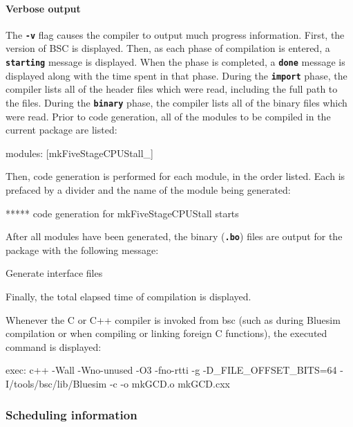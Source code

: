 \documentclass{article}
\newcommand{\te}[1]{\texttt{#1}}
\newenvironment{centerboxverbatim}
  {\center
   \boxedverbatim}
  {\endboxedverbatim
  {\endcenter }}
\begin{document}
\paragraph{Verbose output}
\index{-v@\te{-v} (compiler flag)}
The {\bf\tt -v} flag causes the compiler to output much progress
information.  First, the version of BSC is displayed.
Then, as each phase of compilation
is entered, a {\bf\tt starting} message is displayed.  When the phase
is completed, a {\bf\tt done} message is displayed along with the time
spent in that phase.  During the {\bf\tt import} phase, the compiler
lists all of the header files which were read, including the full path
to the files.  During the {\bf\tt binary} phase, the compiler lists all of
the binary files which were read.  Prior to code generation, all of the
modules to be compiled in the current package are listed:

\begin{centerboxverbatim}
modules: [mkFiveStageCPUStall_]
\end{centerboxverbatim}

Then, code generation is performed for each module, in the order listed.
Each is prefaced by a divider and the name of the module being generated:

\begin{centerboxverbatim}
*****
code generation for mkFiveStageCPUStall starts
\end{centerboxverbatim}

After all modules have been generated, the 
binary ({\bf\tt{}.bo}) files are output for the package with the
following message:

\begin{centerboxverbatim}
Generate interface files
\end{centerboxverbatim}

Finally, the total elapsed time of compilation is displayed.


Whenever the C or C++ compiler is invoked from bsc (such as during
Bluesim compilation or when compiling or linking foreign C functions),
the executed command is displayed:

\begin{centerboxverbatim}
exec: c++ -Wall -Wno-unused -O3 -fno-rtti -g -D_FILE_OFFSET_BITS=64
-I/tools/bsc/lib/Bluesim -c -o mkGCD.o mkGCD.cxx
\end{centerboxverbatim}


\subsubsection{Scheduling information}
\label{sec-schedule-info}
\end{document}
